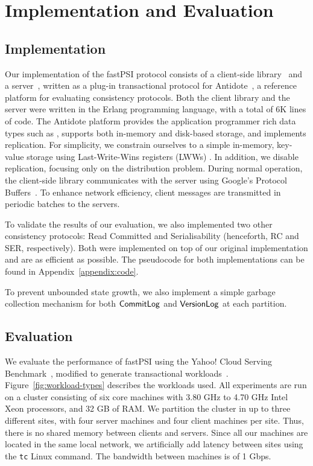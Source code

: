 \cleardoublepage
\chapter{Implementation and Evaluation}
\label{eval_chapter}

\section{Implementation}

Our implementation of the fastPSI protocol consists of a client-side library~\citep{pvc-client} and a server~\citep{pvc-server}, written as a plug-in transactional protocol for Antidote~\citep{antidote-db}, a reference platform for evaluating consistency protocols. Both the client library and the server were written in the Erlang programming language, with a total of 6K lines of code. The Antidote platform provides the application programmer rich data types such as , supports both in-memory and disk-based storage, and implements  replication. For simplicity, we constrain ourselves to a simple in-memory, key-value storage using Last-Write-Wins registers (LWWs) . In addition, we disable replication, focusing only on the distribution problem. During normal operation, the client-side library communicates with the server using Google's Protocol Buffers~\citep{protobuf}. To enhance network efficiency, client messages are transmitted in periodic batches to the servers. 

To validate the results of our evaluation, we also implemented two other consistency protocols: Read Committed and Serialisability (henceforth, RC and SER, respectively). Both were implemented on top of our original implementation and are as efficient as possible. The pseudocode for both implementations can be found in Appendix~\ref{appendix:code}.

To prevent unbounded state growth, we also implement a simple garbage collection mechanism for both $\mathsf{CommitLog}$ and $\mathsf{VersionLog}$ at each partition. 

\section{Evaluation}

We evaluate the performance of fastPSI using the Yahoo! Cloud Serving Benchmark~\citep{ycsb}, modified to generate transactional workloads~\citep{ardekani_nmsi, ardekani_gdur}. Figure~\ref{fig:workload-types} describes the workloads used. All experiments are run on a cluster consisting of six core machines with 3.80 GHz to 4.70 GHz Intel Xeon processors, and 32 GB of RAM. We partition the cluster in up to three different sites, with four server machines and four client machines per site. Thus, there is no shared memory between clients and servers. Since all our machines are located in the same local network, we artificially add latency between sites using the \texttt{tc} Linux command. The bandwidth between machines is of 1 Gbps.

